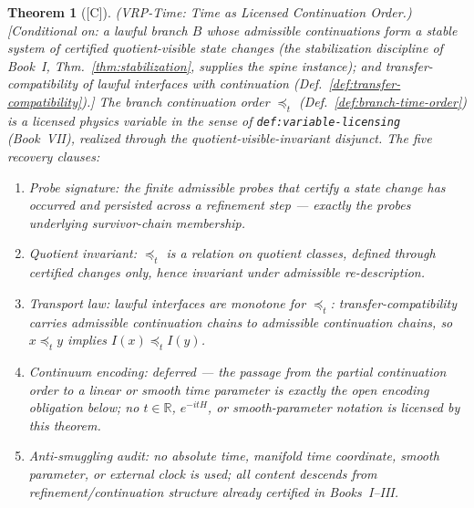 \documentclass[12pt,oneside]{amsbook}
\theoremstyle{plain}
\newtheorem{theorem}{Theorem}[section]
\theoremstyle{definition}
\theoremstyle{remark}
\newcommand{\status}[1]{\textup{[#1]}}
\begin{document}
\begin{theorem}[\status{C}]\label{thm:vrp-time}
\textup{(VRP-Time: Time as Licensed Continuation Order.)}
\textup{[Conditional on: a lawful branch $B$ whose admissible
continuations form a stable system of certified quotient-visible
state changes (the stabilization discipline of Book~I,
Thm.~\ref{thm:stabilization}, supplies the spine instance); and
transfer-compatibility of lawful interfaces with continuation
(Def.~\ref{def:transfer-compatibility}).]}
The branch continuation order $\preceq_t$
(Def.~\ref{def:branch-time-order}) is a licensed physics variable
in the sense of \texttt{def:variable-licensing} (Book~VII),
realized through the quotient-visible-invariant disjunct.  The five
recovery clauses:
\begin{enumerate}[label=\textup{(\arabic*)}]
  \item \emph{Probe signature:} the finite admissible probes that
    certify a state change has occurred and persisted across a
    refinement step --- exactly the probes underlying survivor-chain
    membership.
  \item \emph{Quotient invariant:} $\preceq_t$ is a relation on
    quotient classes, defined through certified changes only, hence
    invariant under admissible re-description.
  \item \emph{Transport law:} lawful interfaces are monotone for
    $\preceq_t$: transfer-compatibility carries admissible
    continuation chains to admissible continuation chains, so
    $x \preceq_t y$ implies $I(x) \preceq_t I(y)$.
  \item \emph{Continuum encoding:} deferred --- the passage from
    the partial continuation order to a linear or smooth time
    parameter is exactly the open encoding obligation below; no
    $t \in \mathbb{R}$, $e^{-itH}$, or smooth-parameter notation
    is licensed by this theorem.
  \item \emph{Anti-smuggling audit:} no absolute time, manifold
    time coordinate, smooth parameter, or external clock is used;
    all content descends from refinement/continuation structure
    already certified in Books~I--III.
\end{enumerate}
\end{theorem}
\end{document}
